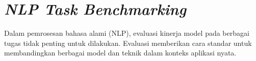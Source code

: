 \section{\textit{NLP Task Benchmarking}}

Dalam pemrosesan bahasa alami (NLP), evaluasi kinerja model pada berbagai tugas tidak penting untuk dilakukan. Evaluasi memberikan cara standar untuk membandingkan berbagai model dan teknik dalam konteks aplikasi nyata.
